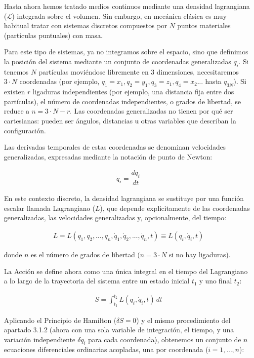 \documentclass[
  spanish,
]{article}
\begin{document}
Hasta ahora hemos tratado medios continuos mediante una densidad
lagrangiana (\(\mathcal{L}\)) integrada sobre el volumen. Sin embargo,
en mecánica clásica es muy habitual tratar con sistemas discretos
compuestos por \(N\) puntos materiales (partículas puntuales) con masa.

Para este tipo de sistemas, ya no integramos sobre el espacio, sino que
definimos la posición del sistema mediante un conjunto de coordenadas
generalizadas \(q_i\). Si tenemos \(N\) partículas moviéndose libremente
en 3 dimensiones, necesitaremos \(3 \cdot N\) coordenadas (por ejemplo,
\(q_1 = x_1, q_2 = y_1, q_3 = z_1, q_4 = x_2...\) hasta \(q_{3N}\)). Si
existen \(r\) ligaduras independientes (por ejemplo, una distancia fija
entre dos partículas), el número de coordenadas independientes, o grados
de libertad, se reduce a \(n = 3 \cdot N - r\). Las coordenadas
generalizadas no tienen por qué ser cartesianas: pueden ser ángulos,
distancias u otras variables que describan la configuración.

Las derivadas temporales de estas coordenadas se denominan velocidades
generalizadas, expresadas mediante la notación de punto de Newton:

\[
\begin{aligned}
\dot{q}_i = \dfrac{dq_i}{dt}
\end{aligned}
\]

En este contexto discreto, la densidad lagrangiana se sustituye por una
función escalar llamada Lagrangiano (\(L\)), que depende explícitamente
de las coordenadas generalizadas, las velocidades generalizadas y,
opcionalmente, del tiempo:

\[
\begin{aligned}
L = L(q_1, q_2, ..., q_{n}, \dot{q}_1, \dot{q}_2, ..., \dot{q}_{n}, t) \equiv L(q_i, \dot{q}_i, t)
\end{aligned}
\]

donde \(n\) es el número de grados de libertad (\(n = 3 \cdot N\) si no
hay ligaduras).

La Acción se define ahora como una única integral en el tiempo del
Lagrangiano a lo largo de la trayectoria del sistema entre un estado
inicial \(t_1\) y uno final \(t_2\):

\[
\begin{aligned}
S = \int_{t_1}^{t_2} L(q_i, \dot{q}_i, t) \, dt
\end{aligned}
\]

Aplicando el Principio de Hamilton (\(\delta S = 0\)) y el mismo
procedimiento del apartado 3.1.2 (ahora con una sola variable de
integración, el tiempo, y una variación independiente \(\delta q_i\)
para cada coordenada), obtenemos un conjunto de \(n\) ecuaciones
diferenciales ordinarias acopladas, una por coordenada
(\(i = 1, \dots, n\)):
\end{document}
